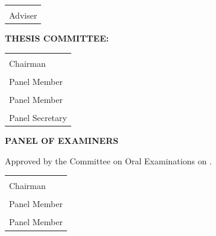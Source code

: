 \documentclass{research}
\begin{document}
\vspace{2em}

\noindent
\begin{tabular}{p{7cm}}
  \\[-1em]
  \underline{\hspace{7cm}} \\
  Adviser \\
\end{tabular}

\vspace{2em}

\noindent
{\bfseries THESIS COMMITTEE:}

\vspace{1em}

\noindent
\begin{tabular}{p{7cm}}
  \underline{\hspace{7cm}} \\
  Chairman \\[1.5em]
  \underline{\hspace{7cm}} \\
  Panel Member \\[1.5em]
  \underline{\hspace{7cm}} \\
  Panel Member \\[1.5em]
  \underline{\hspace{7cm}} \\
  Panel Secretary \\
\end{tabular}

\vspace{2em}

\noindent
{\bfseries PANEL OF EXAMINERS}

\vspace{0.5em}

\noindent Approved by the Committee on Oral Examinations on \underline{\hspace{4cm}}.

\vspace{2em}

\noindent
\begin{tabular}{p{7cm}}
  \underline{\hspace{7cm}} \\
  Chairman \\[1.5em]
  \underline{\hspace{7cm}} \\
  Panel Member \\[1.5em]
  \underline{\hspace{7cm}} \\
  Panel Member \\
\end{tabular}
\end{document}
